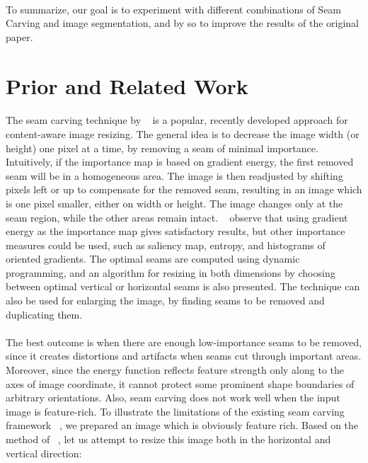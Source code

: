 \documentclass[conference]{acmsiggraph}
\begin{document}
\paragraph{}
To summarize, our goal is to experiment with different combinations of Seam Carving and image segmentation, and by so to improve the results of the original paper.


\section{Prior and Related Work}

\paragraph{}
The seam carving technique by ~\cite{Avidan2007} is a popular, recently developed approach for content-aware image resizing. The general idea is to decrease the image width (or height) one pixel at a time,  by removing a seam of minimal importance. Intuitively, if the importance map is based on gradient energy, the first removed seam will be in a homogeneous area. The image is then readjusted by shifting pixels left or up to compensate for the removed seam, resulting in an image which is one pixel smaller, either on width or height. The image changes only at the seam region, while the other areas remain intact. ~\cite{Avidan2007} observe that using gradient energy as the importance map gives satisfactory results, but other importance measures could be used, such as saliency map, entropy, and histograms of oriented gradients. The optimal seams are computed using dynamic programming, and an algorithm for resizing in both dimensions by choosing between optimal vertical or horizontal seams is also presented. The technique can also be used for enlarging the image, by finding seams to be removed and duplicating them. 

\paragraph{}
The best outcome is when there are enough low-importance seams to be removed, since it creates distortions and artifacts when seams cut through important areas. Moreover, since the energy function reflects feature strength only along to the axes  of image coordinate, it cannot protect some prominent shape boundaries of arbitrary orientations. Also, seam carving does not work well when the input image is feature-rich. To illustrate the limitations of the existing seam carving framework ~\cite{Avidan2007}, we prepared an image which is obviously feature rich. Based on the method of ~\cite{Avidan2007}, let us attempt to resize this image both in the horizontal and vertical direction:
\end{document}
